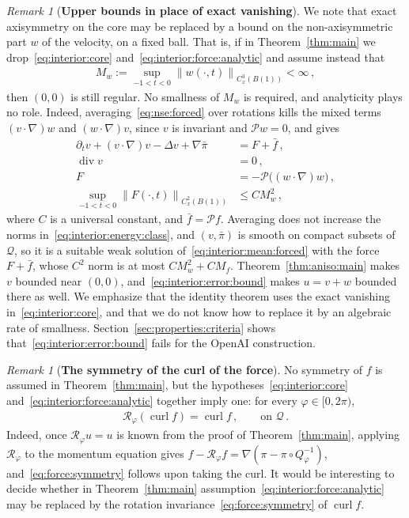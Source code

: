 \documentclass[11pt,reqno]{amsproc}
\numberwithin{equation}{section}
\theoremstyle{remark}
\newtheorem{remark}[theorem]{Remark}
\newcommand{\p}{\partial}
\newcommand{\norm}[1]{\left\|#1\right\|}
\newcommand{\curl}{\operatorname{curl}}
\renewcommand{\div}{\operatorname{div}}
\begin{document}
\begin{remark}[{\bf Upper bounds in place of exact vanishing}]
\label{rem:interior:approximate}
We note that exact axisymmetry on the core may be replaced by a bound on the non-axisymmetric part $w$ of the velocity, on a fixed ball. That is, if in Theorem~\ref{thm:main} we drop~\eqref{eq:interior:core} and~\eqref{eq:interior:force:analytic} and assume instead that 
\begin{align}
M_w:=\sup_{-1<t<0}\norm{w(\cdot,t)}_{C_x^3(B(1))}<\infty
\,,
\label{eq:interior:error:bound}
\end{align}
then $(0,0)$ is still regular. No smallness of $M_w$ is required, and analyticity plays no role. Indeed, averaging~\eqref{eq:nse:forced} over rotations kills the mixed terms $(v\cdot\nabla)w$ and $(w\cdot\nabla)v$, since $v$ is invariant and $\mathcal Pw=0$, and gives
\begin{subequations}
\label{eq:interior:mean:forced}
\begin{align}
\p_tv+(v\cdot\nabla)v-\Delta v+\nabla\bar\pi
&=F+\bar f\,,\\
\div v&=0\,,\\
F&=-\mathcal P\bigl((w\cdot\nabla)w\bigr)\,,
\\
\sup_{-1<t<0}\norm{F(\cdot,t)}_{C_x^2(B(1))}
&\le C M_w^2
\,,
\end{align}
\end{subequations}
where $C$ is a universal constant, and $\bar f=\mathcal Pf$. Averaging does not increase the norms in~\eqref{eq:interior:energy:class}, and $(v,\bar\pi)$ is smooth on compact subsets of $\mathcal Q$, so it is a suitable weak solution of~\eqref{eq:interior:mean:forced} with the force $F+\bar f$, whose $C^2$ norm is at most $CM_w^2+CM_f$. Theorem~\ref{thm:aniso:main} makes $v$ bounded near $(0,0)$, and~\eqref{eq:interior:error:bound} makes $u=v+w$ bounded there as well. We emphasize that the identity theorem uses the exact vanishing in~\eqref{eq:interior:core}, and that we do not know how to replace it by an algebraic rate of smallness.  Section~\ref{sec:properties:criteria} shows that~\eqref{eq:interior:error:bound} fails for the OpenAI construction.
\end{remark}

\begin{remark}[{\bf The symmetry of the curl of the force}]
\label{rem:force:symmetry}
No symmetry of $f$ is assumed in Theorem~\ref{thm:main}, but the hypotheses~\eqref{eq:interior:core} and~\eqref{eq:interior:force:analytic} together imply one: for every $\varphi\in[0,2\pi)$,
\begin{align}
\mathscr R_\varphi(\curl f)=\curl f\,,
\qquad\mbox{on }\mathcal Q
\,.
\label{eq:force:symmetry}
\end{align}
Indeed, once $\mathscr R_\varphi u=u$ is known from the proof of Theorem~\ref{thm:main}, applying $\mathscr R_\varphi$ to the momentum equation gives $f-\mathscr R_\varphi f=\nabla(\pi-\pi\circ Q_\varphi^{-1})$, and~\eqref{eq:force:symmetry} follows upon taking the curl. It would be interesting to decide whether in Theorem~\ref{thm:main} assumption~\eqref{eq:interior:force:analytic} may be replaced by the rotation invariance~\eqref{eq:force:symmetry} of $\curl f$.
\end{remark}
\end{document}
